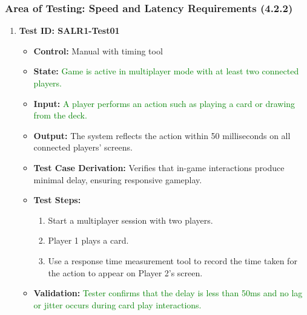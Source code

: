 \documentclass[12pt]{article}
\newcommand{\added}[1]{\textcolor{green}{#1}}
\begin{document}
\subsubsection{Area of Testing: Speed and Latency Requirements (4.2.2)}

\begin{enumerate}
    \item \textbf{Test ID: SALR1-Test01}
    \begin{itemize}
        \item \textbf{Control:} Manual with timing tool
        \item \textbf{State:} \added{Game is active in multiplayer mode with at least two connected players.}
        \item \textbf{Input:} \added{A player performs an action such as playing a card or drawing from the deck.}
        \item \textbf{Output:} The system reflects the action within 50 milliseconds on all connected players’ screens.
        \item \textbf{Test Case Derivation:} Verifies that in-game interactions produce minimal delay, ensuring responsive gameplay.
        \item \textbf{Test Steps:}
        \begin{enumerate}
            \item Start a multiplayer session with two players.
            \item Player 1 plays a card.
            \item Use a response time measurement tool to record the time taken for the action to appear on Player 2’s screen.
        \end{enumerate}
        \item \textbf{Validation:} \added{Tester confirms that the delay is less than 50ms and no lag or jitter occurs during card play interactions.}
    \end{itemize}


\end{enumerate}
\end{document}
